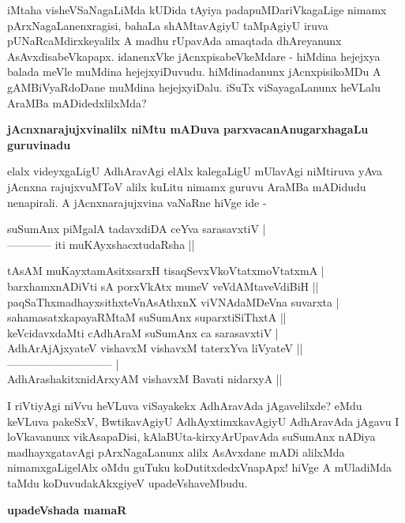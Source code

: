 iMtaha visheVSaNagaLiMda kUDida tAyiya padapuMDariVkagaLige nimamx pArxNa\-gaLanenxragisi, bahaLa shAMta\-vAgiyU taMpAgiyU iruva pUNaRcaMdirxkeyalilx A madhu rUpavAda amaqtada dhAre\-yanunx A\-sAvx\-disabeVkapapx. idanenxVke jAcnxpisabeVkeMdare - hiMdina hejejxya balada meVle muMdina hejejxyiDu\-vudu. \-hiMdinadanunx jAcnxpisikoMDu A gAMBiVyaRdoDane muMdina hejejxyiDalu. iSuTx viSaya\-gaLanunx heVLalu AraMBa mADidedxlilxMda?

{\bigskip
\noindent
{\large\bf jAcnxnarajujxvinalilx niMtu mADuva parxvacanAnugarxhagaLu guruvinadu}}\label{page82}
\medskip

\noindent
elalx videyxgaLigU AdhAravAgi elAlx kalegaLigU mUlavAgi niMtiruva yAva jAcnxna rajujxvuMToV alilx kuLitu nimamx guruvu AraMBa mADidudu nenapirali. A jAcnxnarajujxvina vaNaRne hiVge ide - 

\begin{shloka}
suSumAnx piMgalA tadavxdiDA ceYva sarasavxtiV |\\\label{82}
------------ iti muKAyxshacxtudaRsha ||
\end{shloka}

\begin{shloka}
tAsAM muKayxtamAsitxsarxH tisaqSevxVkoVtatxmoVtatxmA |\\
barxhamxnADiVti sA porxVkAtx muneV veVdAMtaveVdiBiH ||\\
paqSaThxmadhayxsithxteVnAsAthxnX viVNAdaMDeVna suvarxta |\\
sahamasatxkapayaRMtaM suSumAnx suparxtiSiThxtA ||\\

keVcidavxdaMti cAdhAraM suSumAnx ca sarasavxtiV |\\\label{82}
AdhArAjAjxyateV vishavxM vishavxM taterxYva liVyateV ||\\
----------------------------- |\\
AdhArashakitxnidArxyAM vishavxM Bavati nidarxyA ||
\end{shloka}

I riVtiyAgi niVvu heVLuva viSayakekx AdhAravAda jAgavelilxde? eMdu keVLuva pakeSxV, Bwtika\-vAgiyU AdhAyxtimxkavAgiyU AdhAravAda jAgavu I loVkavanunx vikAsapaDisi, kAlaBUta-kirxyArUpavAda suSumAnx nADiya madhayxgatavAgi pArxNagaLanunx alilx AsAvxdane mADi alilxMda nimamxgaLi\-gelAlx oMdu guTuku koDutitxdedxVnapApx! hiVge A mUladiMda taMdu koDuvudakAkxgiyeV upadeVsha\-veMbudu.

{\bigskip
\noindent
{\large\bf upadeVshada mamaR}}\label{page83}
\medskip

